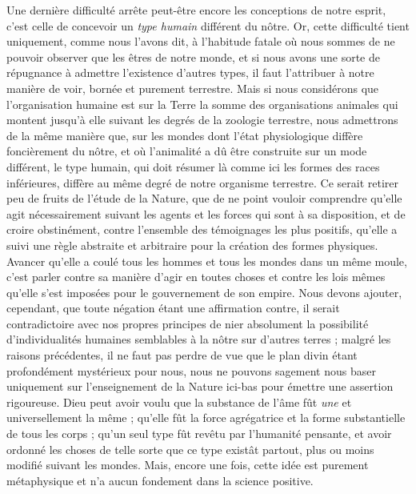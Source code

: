 \documentclass[a4paper, 11pt, oneside, landscape]{article}
\begin{document}
Une dernière difficulté arrête peut-être encore les conceptions de notre esprit, c'est celle de concevoir un \emph{type humain} différent du nôtre. Or, cette difficulté tient uniquement, comme nous l'avons dit, à l'habitude fatale où nous sommes de ne pouvoir observer que les êtres de notre monde, et si nous avons une sorte de répugnance à admettre l'existence d'autres types, il faut l'attribuer à notre manière de voir, bornée et purement terrestre. Mais si nous considérons que l'organisation humaine est sur la Terre la somme des organisations animales qui montent jusqu'à elle suivant les degrés de la zoologie terrestre, nous admettrons de la même manière que, sur les mondes dont l'état physiologique diffère foncièrement du nôtre, et où l'animalité a dû être construite sur un mode différent, le type humain, qui doit résumer là comme ici les formes des races inférieures, diffère au même degré de notre organisme terrestre. Ce serait retirer peu de fruits de l'étude de la Nature, que de ne point vouloir comprendre qu'elle agit nécessairement suivant les agents et les forces qui sont à sa disposition, et de croire obstinément, contre l'ensemble des témoignages les plus positifs, qu'elle a suivi une règle abstraite et arbitraire pour la création des formes physiques. Avancer qu'elle a coulé tous les hommes et tous les mondes dans un même moule, c'est parler contre sa manière d'agir en toutes choses et contre les lois mêmes qu'elle s'est imposées pour le gouvernement de son empire. Nous devons ajouter, cependant, que toute négation étant une affirmation contre, il serait contradictoire avec nos propres principes de nier absolument la possibilité d'individualités humaines semblables à la nôtre sur d'autres terres ; malgré les raisons précédentes, il ne faut pas perdre de vue que le plan divin étant profondément mystérieux pour nous, nous ne pouvons sagement nous baser uniquement sur l'enseignement de la Nature ici-bas pour émettre une assertion rigoureuse. Dieu peut avoir voulu que la substance de l'âme fût \emph{une} et universellement la même ; qu'elle fût la force agrégatrice et la forme substantielle de tous les corps ; qu'un seul type fût revêtu par l'humanité pensante, et avoir ordonné les choses de telle sorte que ce type existât partout, plus ou moins modifié suivant les mondes. Mais, encore une fois, cette idée est purement métaphysique et n'a aucun fondement dans la science positive.
\end{document}
